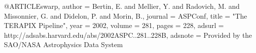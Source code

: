 
@ARTICLE{swarp,
   author = {{Bertin}, E. and {Mellier}, Y. and {Radovich}, M. and {Missonnier}, G. and
    {Didelon}, P. and {Morin}, B.},
  journal = {ASPConf},
    title = "{The TERAPIX Pipeline}",
     year = {2002},
   volume = {281},
    pages = {228},
   adsurl = {http://adsabs.harvard.edu/abs/2002ASPC..281..228B},
  adsnote = {Provided by the SAO/NASA Astrophysics Data System}
}
